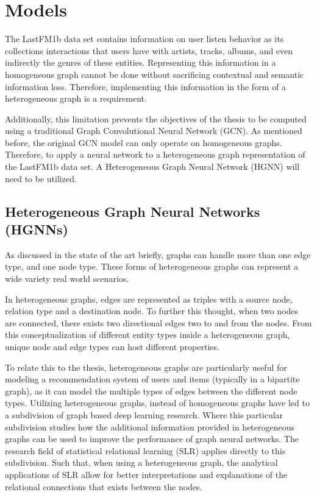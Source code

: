 \section{Models}

The LastFM1b data set contains information on user listen behavior as its collections interactions that users have with artists, tracks, albums, and even indirectly the genres of these entities. Representing this information in a homogeneous graph cannot be done without sacrificing contextual and semantic information loss. Therefore, implementing this information in the form of a heterogeneous graph is a requirement.

Additionally, this limitation prevents the objectives of the thesis to be computed using a traditional Graph Convolutional Neural Network (GCN). As mentioned before, the original GCN model can only operate on homogeneous graphs. Therefore, to apply a neural network to a heterogeneous graph representation of the LastFM1b data set. A Heterogeneous Graph Neural Network (HGNN) will need to be utilized.

\subsection{Heterogeneous Graph Neural Networks (HGNNs)}
As discussed in the state of the art briefly, graphs can handle more than one edge type, and one node type. These forms of heterogeneous graphs can represent a wide variety real world scenarios.




In heterogeneous graphs, edges are represented as triples with a source node, relation type and a destination node. To further this thought, when two nodes are connected, there exists two directional edges two to and from the nodes. From this conceptualization of different entity types inside a heterogeneous graph, unique node and edge types can host different properties. 

To relate this to the thesis, heterogeneous graphs are particularly useful for modeling a recommendation system of users and items (typically in a bipartite graph), as it can model the multiple types of edges between the different node types. Utilizing heterogeneous graphs, instead of homogeneous graphs have led to a subdivision of graph based deep learning research. Where this particular subdivision studies how the additional information provided in heterogeneous graphs can be used to improve the performance of graph neural networks. \cite{wang2019kgat} The research field of statistical relational learning (SLR) applies directly to this subdivision. \cite{koller2007introduction} Such that, when using a heterogeneous graph, the analytical applications of SLR allow for better interpretations and explanations of the relational connections that exists between the nodes.


